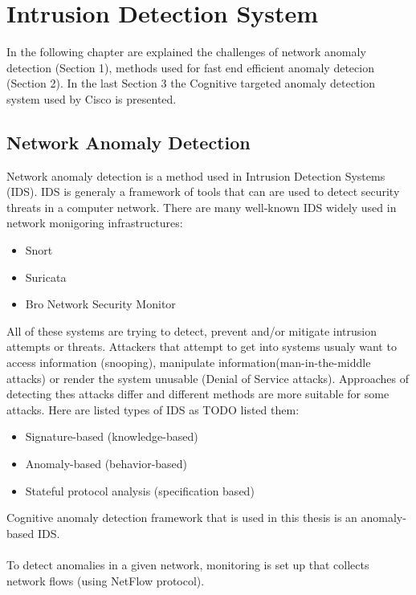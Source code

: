 \documentclass[thesis=B,english]{FITthesis}[2012/10/20]
\begin{document}
\chapter{Intrusion Detection System}

In the following chapter are explained the challenges of network anomaly detection (Section 1), methods used for fast end efficient anomaly detecion (Section 2).
In the last Section 3 the Cognitive targeted anomaly detection system used by Cisco is presented.

\section{Network Anomaly Detection}
Network anomaly detection is a method used in Intrusion Detection Systems (IDS).
IDS is generaly a framework of tools that can are used to detect security threats in a computer network.
There are many well-known IDS widely used in network monigoring infrastructures:
\begin{itemize}
    \item Snort
    \item Suricata
    \item Bro Network Security Monitor
\end{itemize}
All of these systems are trying to detect, prevent and/or mitigate intrusion attempts or threats.
Attackers that attempt to get into systems usualy want to access information (snooping), manipulate information(man-in-the-middle attacks) or render the system unusable (Denial of Service attacks).
Approaches of detecting thes attacks differ and different methods are more suitable for some attacks.
Here are listed types of IDS as TODO listed them:
\begin{itemize}
    \item Signature-based (knowledge-based)
    \item Anomaly-based (behavior-based)
    \item Stateful protocol analysis (specification based)
\end{itemize}
Cognitive anomaly detection framework that is used in this thesis is an anomaly-based IDS.
\\ \\
To detect anomalies in a given network, monitoring is set up that collects network flows (using NetFlow protocol).
\end{document}
